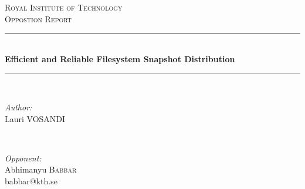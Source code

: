 \documentclass[12pt]{article}
\begin{document}
\begin{titlepage}

\newcommand{\HRule}{\rule{\linewidth}{0.5mm}} %

\center %
 

\textsc{\LARGE Royal Institute of Technology}\\[1.5cm] %
\textsc{\Large Oppostion Report}\\[0.5cm] %


\HRule \\[0.8cm]
{\Large \bfseries Efficient and Reliable Filesystem Snapshot Distribution }\\[0.4cm] %
\HRule \\[1.5cm]
 

\begin{minipage}{0.4\textwidth}
\begin{flushleft} \large
\emph{Author:}\\
Lauri \textsc{VOSANDI} %
\end{flushleft}
\end{minipage}
~
\begin{minipage}{0.4\textwidth}
\begin{flushright} \large
\emph{Opponent:} \\
Abhimanyu \textsc{Babbar}\\ %
babbar@kth.se

\end{flushright}
\end{minipage}\\[4cm]



\end{titlepage}
\end{document}
